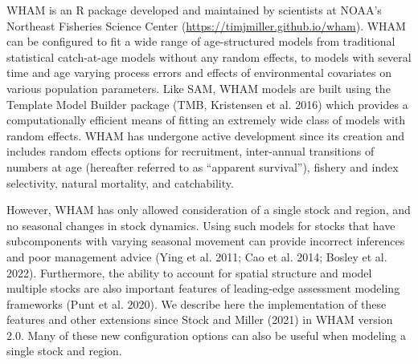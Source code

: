 \documentclass[
]{article}
\begin{document}
WHAM is an R package developed and maintained by scientists at NOAA's Northeast Fisheries Science Center (\url{https://timjmiller.github.io/wham}). WHAM can be configured to fit a wide range of age-structured models from traditional statistical catch-at-age models without any random effects, to models with several time and age varying process errors and effects of environmental covariates on various population parameters. Like SAM, WHAM models are built using the Template Model Builder package (TMB, Kristensen et al. 2016) which provides a computationally efficient means of fitting an extremely wide class of models with random effects. WHAM has undergone active development since its creation and includes random effects options for recruitment, inter-annual transitions of numbers at age (hereafter referred to as ``apparent survival''), fishery and index selectivity, natural mortality, and catchability.

However, WHAM has only allowed consideration of a single stock and region, and no seasonal changes in stock dynamics. Using such models for stocks that have subcomponents with varying seasonal movement can provide incorrect inferences and poor management advice (Ying et al. 2011; Cao et al. 2014; Bosley et al. 2022). Furthermore, the ability to account for spatial structure and model multiple stocks are also important features of leading-edge assessment modeling frameworks (Punt et al. 2020). We describe here the implementation of these features and other extensions since Stock and Miller (2021) in WHAM version 2.0. Many of these new configuration options can also be useful when modeling a single stock and region.
\end{document}
